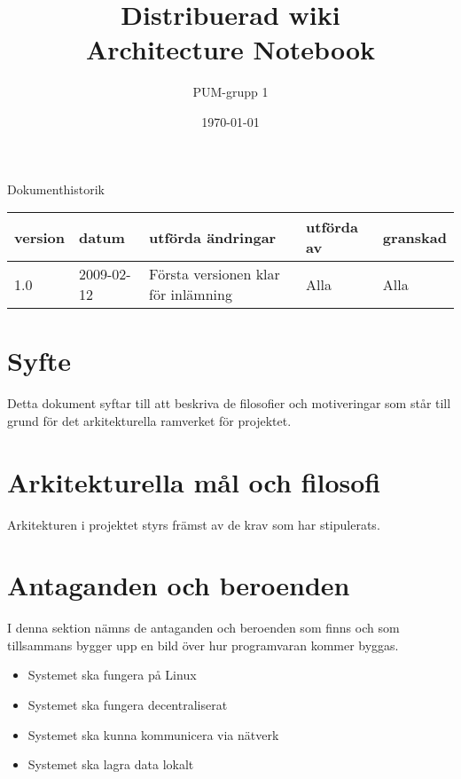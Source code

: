 

\ifpdf
\else
\fi

\title{Distribuerad wiki \\ Architecture Notebook}
\author{PUM-grupp 1}
\date{\today}



\maketitle

\thispagestyle{empty}

\newpage

{\centering \Large{Dokumenthistorik\\}}

\vspace{10pt}
\begin{tabularx}{\textwidth}{ |l|l|X|l|l| }
  \hline
    \textbf{version} & \textbf{datum} & \textbf{utförda ändringar} & \textbf{utförda av} & \textbf{granskad} \\
	\hline 
  1.0 & 2009-02-12 &  Första versionen klar för inlämning  & Alla & Alla   \\
  \hline
\end{tabularx}

\newpage

\setcounter{tocdepth}{2}
\tableofcontents
\newpage

\section{Syfte}
Detta dokument syftar till att beskriva de filosofier och motiveringar som står till grund för det arkitekturella ramverket för projektet.
\section{Arkitekturella mål och filosofi}
Arkitekturen i projektet styrs främst av de krav som har stipulerats.
\section{Antaganden och beroenden}
I denna sektion nämns de antaganden och beroenden som finns och som tillsammans bygger upp en bild över hur programvaran kommer byggas.
\begin{itemize}
\item Systemet ska fungera på Linux
\item Systemet ska fungera decentraliserat
\item Systemet ska kunna kommunicera via nätverk
\item Systemet ska lagra data lokalt
\end{itemize}
